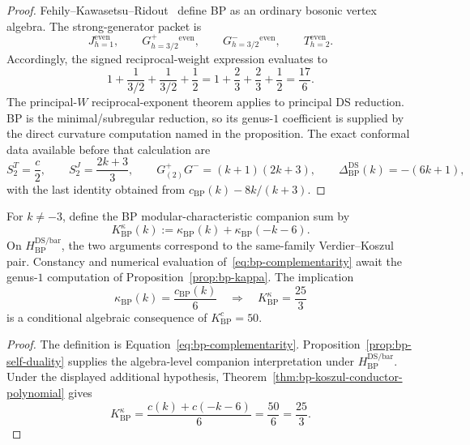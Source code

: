 \begin{proof}
Fehily--Kawasetsu--Ridout~\cite[Definition~2.1]{FKR20} define BP as an
ordinary bosonic vertex algebra.  The strong-generator packet is
\[
J_{h=1}^{\mathrm{even}},\qquad
G^+_{h=3/2}^{\mathrm{even}},\qquad
G^-_{h=3/2}^{\mathrm{even}},\qquad
T_{h=2}^{\mathrm{even}}.
\]
Accordingly, the signed reciprocal-weight expression evaluates to
\[
1+\frac{1}{3/2}+\frac{1}{3/2}+\frac{1}{2}
=1+\frac23+\frac23+\frac12=\frac{17}{6}.
\]
The principal-$W$ reciprocal-exponent theorem applies to principal DS
reduction.  BP is the minimal/subregular reduction, so its genus-$1$
coefficient is supplied by the direct curvature computation named in
the proposition.  The exact conformal data available before that
calculation are
\[
S_2^T=\frac c2,\qquad
S_2^J=\frac{2k+3}{3},\qquad
G^+_{(2)}G^-=(k+1)(2k+3),\qquad
\Delta^{\mathrm{DS}}_{\mathrm{BP}}(k)=-(6k+1),
\]
with the last identity obtained from
$c_{\mathrm{BP}}(k)-8k/(k+3)$.
\end{proof}

\begin{proposition}
\label{prop:bp-complementarity}
For $k\ne-3$, define the BP modular-characteristic companion sum by
\begin{equation}\label{eq:bp-complementarity}
K^\kappa_{\mathrm{BP}}(k)
:=\kappa_{\mathrm{BP}}(k)+\kappa_{\mathrm{BP}}(-k-6).
\end{equation}
On $H_{\mathrm{BP}}^{\mathrm{DS/bar}}$, the two arguments correspond to
the same-family Verdier--Koszul pair.  Constancy and numerical
evaluation of~\eqref{eq:bp-complementarity} await the genus-$1$
computation of Proposition~\ref{prop:bp-kappa}.  The implication
\[
\kappa_{\mathrm{BP}}(k)=\frac{c_{\mathrm{BP}}(k)}6
\quad\Longrightarrow\quad
K^\kappa_{\mathrm{BP}}=\frac{25}{3}
\]
is a conditional algebraic consequence of $K^c_{\mathrm{BP}}=50$.
\end{proposition}

\begin{proof}
The definition is Equation~\eqref{eq:bp-complementarity}.
Proposition~\ref{prop:bp-self-duality} supplies the algebra-level
companion interpretation under $H_{\mathrm{BP}}^{\mathrm{DS/bar}}$.
Under the displayed additional hypothesis,
Theorem~\ref{thm:bp-koszul-conductor-polynomial} gives
\[
K^\kappa_{\mathrm{BP}}
=\frac{c(k)+c(-k-6)}6=\frac{50}{6}=\frac{25}{3}.
\]
\end{proof}

